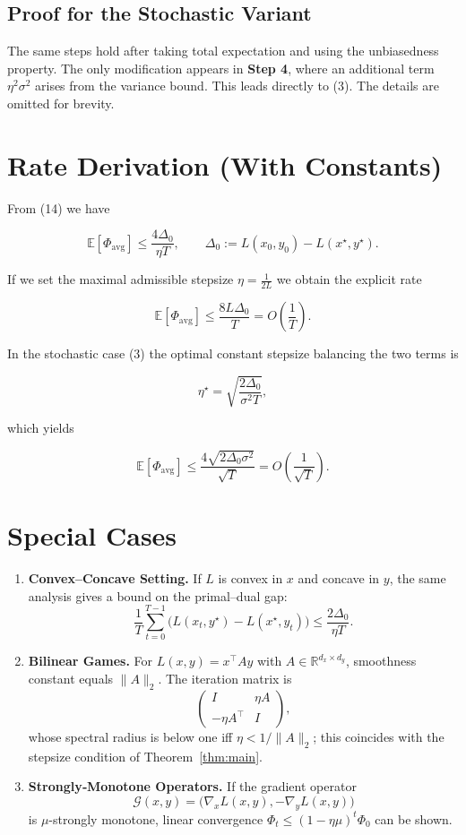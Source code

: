 \documentclass{article}
\begin{document}
\subsection*{Proof for the Stochastic Variant}
The same steps hold after taking total expectation and using the unbiasedness property. The only modification appears in \textbf{Step 4}, where an additional term \(\eta^2\sigma^2\) arises from the variance bound. This leads directly to (3). The details are omitted for brevity.

\section*{Rate Derivation (With Constants)}
From (14) we have  

\[
\boxed{
\mathbb{E}\!\left[\Phi_{\text{avg}}\right]
\le
\frac{4\Delta_0}{\eta T}},\qquad 
\Delta_0:=L(x_0,y_0)-L(x^\star,y^\star).
\]

If we set the maximal admissible stepsize \(\eta=\frac{1}{2L}\) we obtain the explicit rate  

\[
\mathbb{E}\!\left[\Phi_{\text{avg}}\right]
\le
\frac{8L\Delta_0}{T}=O\!\left(\frac{1}{T}\right).
\]

In the stochastic case (3) the optimal constant stepsize balancing the two terms is  

\[
\eta^\star = \sqrt{\frac{2\Delta_0}{\sigma^2 T}},
\]

which yields  

\[
\mathbb{E}\!\left[\Phi_{\text{avg}}\right]
\le
\frac{4\sqrt{2\Delta_0\sigma^2}}{\sqrt{T}} = O\!\left(\frac{1}{\sqrt{T}}\right).
\]

\section*{Special Cases}
\begin{enumerate}
\item \textbf{Convex–Concave Setting.} If \(L\) is convex in \(x\) and concave in \(y\), the same analysis gives a bound on the primal–dual gap:
\[
\frac{1}{T}\sum_{t=0}^{T-1}\big(L(x_t,y^\star)-L(x^\star,y_t)\big)
\le
\frac{2\Delta_0}{\eta T}.
\]

\item \textbf{Bilinear Games.} For \(L(x,y)=x^\top Ay\) with \(A\in\mathbb{R}^{d_x\times d_y}\), smoothness constant equals \(\|A\|_2\). The iteration matrix is 
\[
\begin{pmatrix}
I & \eta A\\
-\eta A^\top & I
\end{pmatrix},
\]
whose spectral radius is below one iff \(\eta<1/\|A\|_2\); this coincides with the stepsize condition of Theorem~\ref{thm:main}.

\item \textbf{Strongly‑Monotone Operators.} If the gradient operator 
\[
\mathcal{G}(x,y)=\big(\nabla_x L(x,y),-\nabla_y L(x,y)\big)
\]
is \(\mu\)-strongly monotone, linear convergence 
\(\Phi_t\le (1-\eta\mu)^t\Phi_0\) can be shown.
\end{enumerate}
\end{document}

